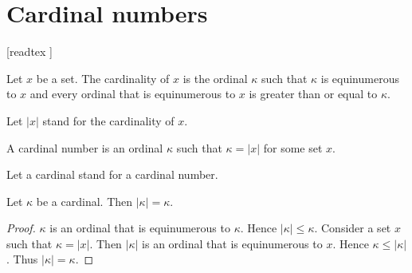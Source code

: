 \documentclass[../set-theory.tex]{subfiles}
\begin{document}
  \chapter{Cardinal numbers}\label{chapter:cardinals}


  \begin{forthel}

    [readtex ]

  \end{forthel}


  \begin{forthel}
    \begin{definition}
      Let $x$ be a set.
      The cardinality of $x$ is the ordinal $\kappa$ such that $\kappa$ is
      equinumerous to $x$ and every ordinal that is equinumerous to $x$ is
      greater than or equal to $\kappa$.
    \end{definition}

    Let $|x|$ stand for the cardinality of $x$.
  \end{forthel}

  \begin{forthel}
    \begin{definition}
      A cardinal number is an ordinal $\kappa$ such that $\kappa = |x|$ for some
      set $x$.
    \end{definition}

    Let a cardinal stand for a cardinal number.
  \end{forthel}

  \begin{forthel}
    \begin{proposition}
      Let $\kappa$ be a cardinal.
      Then $|\kappa| = \kappa$.
    \end{proposition}
    \begin{proof}
      $\kappa$ is an ordinal that is equinumerous to $\kappa$.
      Hence $|\kappa| \leq \kappa$.
      Consider a set $x$ such that $\kappa = |x|$.
      Then $|\kappa|$ is an ordinal that is equinumerous to $x$.
      Hence $\kappa \leq |\kappa|$.
      Thus $|\kappa| = \kappa$.
    \end{proof}
  \end{forthel}
\end{document}
